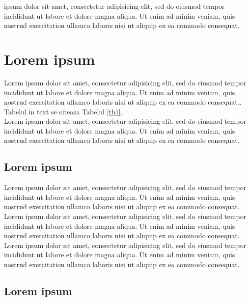 \documentclass[12pt,openright,twoside]{book}
\begin{document}
 ipsum dolor sit amet, consectetur adipisicing elit, sed do eiusmod tempor incididunt ut labore et dolore magna aliqua. Ut enim ad minim veniam, quis nostrud exercitation ullamco laboris nisi ut aliquip ex ea commodo consequat.\\

\section{Lorem ipsum}

Lorem ipsum dolor sit amet, consectetur adipisicing elit, sed do eiusmod tempor incididunt ut labore et dolore magna aliqua. Ut enim ad minim veniam, quis nostrud exercitation ullamco laboris nisi ut aliquip ex ea commodo consequat..\\

Tabelul in text se citeaza Tabelul \ref{tb1}.\\Lorem ipsum dolor sit amet, consectetur adipisicing elit, sed do eiusmod tempor incididunt ut labore et dolore magna aliqua. Ut enim ad minim veniam, quis nostrud exercitation ullamco laboris nisi ut aliquip ex ea commodo consequat.\\



\subsection{Lorem ipsum}

Lorem ipsum dolor sit amet, consectetur adipisicing elit, sed do eiusmod tempor incididunt ut labore et dolore magna aliqua. Ut enim ad minim veniam, quis nostrud exercitation ullamco laboris nisi ut aliquip ex ea commodo consequat.\\

Lorem ipsum dolor sit amet, consectetur adipisicing elit, sed do eiusmod tempor incididunt ut labore et dolore magna aliqua. Ut enim ad minim veniam, quis nostrud exercitation ullamco laboris nisi ut aliquip ex ea commodo consequat.\\

Lorem ipsum dolor sit amet, consectetur adipisicing elit, sed do eiusmod tempor incididunt ut labore et dolore magna aliqua. Ut enim ad minim veniam, quis nostrud exercitation ullamco laboris nisi ut aliquip ex ea commodo consequat.\\

\subsection{Lorem ipsum}
\end{document}
